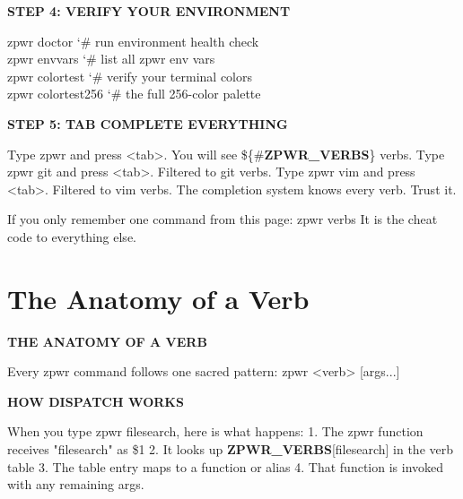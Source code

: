 \documentclass[11pt,a4paper,twoside]{book}
\begin{document}
\vspace{12pt}
{\bfseries\color{neonyellow} STEP 4: VERIFY YOUR ENVIRONMENT}\vspace{4pt}

\begin{codebox}
\color{neongreen}zpwr doctor             {\char`\#} run environment health check\\
\color{neongreen}zpwr envvars            {\char`\#} list all zpwr env vars\\
\color{neongreen}zpwr colortest          {\char`\#} verify your terminal colors\\
\color{neongreen}zpwr colortest256       {\char`\#} the full 256-color palette\\
\end{codebox}


\vspace{12pt}
{\bfseries\color{neonyellow} STEP 5: TAB COMPLETE EVERYTHING}\vspace{4pt}

Type zpwr and press <tab>. You will see \$\{\#\textbf{ZPWR\_VERBS}\} verbs. Type zpwr git and press <tab>. Filtered to git verbs. Type zpwr vim and press <tab>. Filtered to vim verbs. The completion system knows every verb. Trust it.

If you only remember one command from this page: zpwr verbs It is the cheat code to everything else.


\vspace{16pt}

\section{The Anatomy of a Verb}


\vspace{10pt}
{\large\bfseries\color{neoncyan} THE ANATOMY OF A VERB}\vspace{6pt}

Every zpwr command follows one sacred pattern: zpwr <verb> [args...]


\vspace{12pt}
{\bfseries\color{neonyellow} HOW DISPATCH WORKS}\vspace{4pt}

When you type zpwr filesearch, here is what happens: 1. The zpwr function receives "filesearch" as \$1 2. It looks up \textbf{ZPWR\_VERBS}[filesearch] in the verb table 3. The table entry maps to a function or alias 4. That function is invoked with any remaining args.
\end{document}
